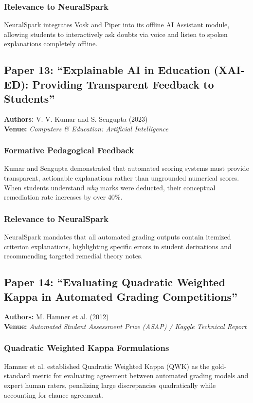 \subsubsection{Relevance to NeuralSpark}
NeuralSpark integrates Vosk and Piper into its offline AI Assistant module, allowing students to interactively ask doubts via voice and listen to spoken explanations completely offline.

\subsection{Paper 13: ``Explainable AI in Education (XAI-ED): Providing Transparent Feedback to Students''}
\textbf{Authors:} V. V. Kumar and S. Sengupta (2023) \cite{kumar2023} \\
\textbf{Venue:} \textit{Computers \& Education: Artificial Intelligence}

\subsubsection{Formative Pedagogical Feedback}
Kumar and Sengupta demonstrated that automated scoring systems must provide transparent, actionable explanations rather than ungrounded numerical scores. When students understand \textit{why} marks were deducted, their conceptual remediation rate increases by over 40\%.

\subsubsection{Relevance to NeuralSpark}
NeuralSpark mandates that all automated grading outputs contain itemized criterion explanations, highlighting specific errors in student derivations and recommending targeted remedial theory notes.

\subsection{Paper 14: ``Evaluating Quadratic Weighted Kappa in Automated Grading Competitions''}
\textbf{Authors:} M. Hamner et al. (2012) \cite{hamner2012} \\
\textbf{Venue:} \textit{Automated Student Assessment Prize (ASAP) / Kaggle Technical Report}

\subsubsection{Quadratic Weighted Kappa Formulations}
Hamner et al. established Quadratic Weighted Kappa (QWK) as the gold-standard metric for evaluating agreement between automated grading models and expert human raters, penalizing large discrepancies quadratically while accounting for chance agreement.

